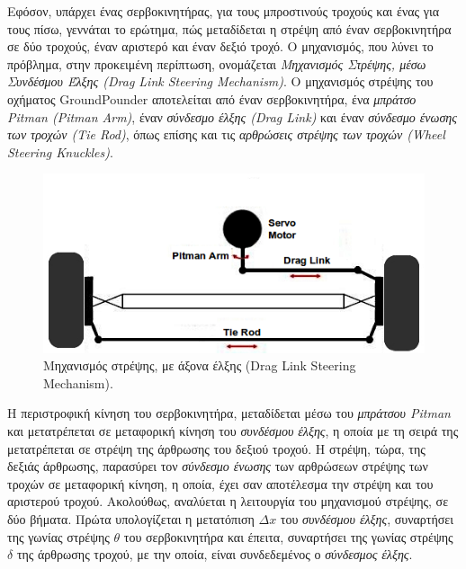 \bigskip
Εφόσον, υπάρχει ένας σερβοκινητήρας, για τους μπροστινούς τροχούς και ένας για τους πίσω, γεννάται το ερώτημα, πώς μεταδίδεται η στρέψη από έναν σερβοκινητήρα σε δύο τροχούς, έναν αριστερό και έναν δεξιό τροχό. Ο μηχανισμός, που λύνει το πρόβλημα, στην προκειμένη περίπτωση, ονομάζεται \textit{Μηχανισμός Στρέψης, μέσω Συνδέσμου Έλξης (Drag Link Steering Mechanism)}. Ο  μηχανισμός στρέψης του οχήματος GroundPounder αποτελείται από έναν σερβοκινητήρα, ένα \textit{μπράτσο Pitman (Pitman Arm)}, έναν \textit{σύνδεσμο έλξης (Drag Link)} και έναν \textit{σύνδεσμο ένωσης των τροχών (Tie Rod)}, όπως επίσης και τις \textit{αρθρώσεις στρέψης των τροχών (Wheel Steering Knuckles)}.

\begin{figure}[!ht]
	\centering
	\includegraphics[width=0.6\linewidth]{Chapters/Chapter2/Figures/my_drag_link_steering.png}
	\caption{Μηχανισμός στρέψης, με άξονα έλξης (Drag Link Steering Mechanism).}
	\label{fig:drag_link_steering}
\end{figure}

\bigskip
Η περιστροφική κίνηση του σερβοκινητήρα, μεταδίδεται μέσω του \textit{μπράτσου Pitman} και μετατρέπεται σε μεταφορική κίνηση του \textit{συνδέσμου έλξης}, η οποία με τη σειρά της μετατρέπεται σε στρέψη της άρθρωσης του δεξιού τροχού. Η στρέψη, τώρα, της δεξιάς άρθρωσης, παρασύρει τον \textit{σύνδεσμο ένωσης} των αρθρώσεων στρέψης των τροχών σε μεταφορική κίνηση, η οποία, έχει σαν αποτέλεσμα την στρέψη και του αριστερού τροχού. Ακολούθως, αναλύεται η λειτουργία του μηχανισμού στρέψης, σε δύο βήματα. Πρώτα υπολογίζεται η μετατόπιση $\Delta x$ του \textit{συνδέσμου έλξης}, συναρτήσει της γωνίας στρέψης $\theta$ του σερβοκινητήρα και έπειτα, συναρτήσει της γωνίας στρέψης $\delta$ της άρθρωσης τροχού, με την οποία, είναι συνδεδεμένος ο \textit{σύνδεσμος έλξης}.

